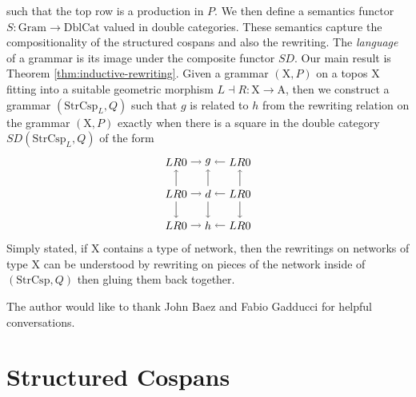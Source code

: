 \documentclass{amsart}
\newcommand{\A}{\cat{A}}
\newcommand{\X}{\cat{X}}
\newcommand{\DblCat}{\cat{DblCat}}
\newcommand{\Gram}{\cat{Gram}}
\newcommand{\StrCsp}{\cat{StrCsp}}
\newcommand{\cat}[1]{\mathrm{#1}}
\newcommand{\from}{\colon}
\theoremstyle{remark}
\theoremstyle{definition}
\begin{document}
% 
such that the top row is a production in $ P $. We then define a
semantics functor $ S \from \Gram \to \DblCat $ valued in double
categories.  These semantics capture the compositionality of the
structured cospans and also the rewriting.  The \emph{language} of a
grammar is its image under the composite functor $ SD $. Our main
result is Theorem \ref{thm:inductive-rewriting}. Given a grammar
$ ( \X , P ) $ on a topos $ \X $ fitting into a suitable geometric
morphism $ L \dashv R \from \X \to \A $, then we construct a grammar $
( \StrCsp_L , Q ) $ such that $ g $ is related to $ h $ from the
rewriting relation on the grammar $ ( \X , P ) $ exactly when there is
a square in the double category $ SD ( \StrCsp_L , Q ) $ of the form
\[
    \begin{tikzpicture}
      \node (1t) at (0,2) {$ LR 0 $};
      \node (2t) at (1,2) {$ g $};
      \node (3t) at (2,2) {$ LR 0 $};
      \node (1m) at (0,1) {$ LR 0 $};
      \node (2m) at (1,1) {$ d $};
      \node (3m) at (2,1) {$ LR 0 $};
      \node (1b) at (0,0) {$ LR 0 $};
      \node (2b) at (1,0) {$ h $};
      \node (3b) at (2,0) {$ LR 0 $};
      \draw [->] (1t) to node [] {\scriptsize{$  $}} (2t);
      \draw [->] (3t) to node [] {\scriptsize{$  $}} (2t);
      \draw [->] (1m) to node [] {\scriptsize{$  $}} (2m);
      \draw [->] (3m) to node [] {\scriptsize{$  $}} (2m);
      \draw [->] (1b) to node [] {\scriptsize{$  $}} (2b);
      \draw [->] (3b) to node [] {\scriptsize{$  $}} (2b);
      \draw [->] (1m) to node [] {\scriptsize{$  $}} (1t);
      \draw [->] (1m) to node [] {\scriptsize{$  $}} (1b);
      \draw [->] (2m) to node [] {\scriptsize{$  $}} (2t);
      \draw [->] (2m) to node [] {\scriptsize{$  $}} (2b);
      \draw [->] (3m) to node [] {\scriptsize{$  $}} (3t);
      \draw [->] (3m) to node [] {\scriptsize{$  $}} (3b);
    \end{tikzpicture}
\]
Simply stated, if $ \X $ contains a type of network, then the
rewritings on networks of type $ \X $ can be understood by rewriting
on pieces of the network inside of $ ( \StrCsp , Q ) $ then gluing
them back together.

The author would like to thank John Baez and Fabio Gadducci for
helpful conversations.


\section{Structured Cospans}
\label{sec:StrCsp}
\end{document}
